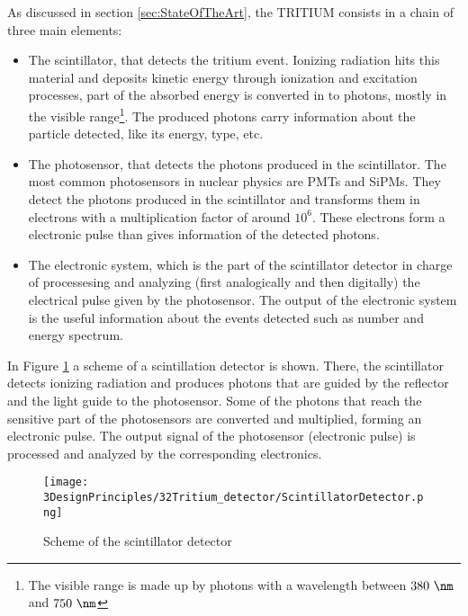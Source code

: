 As discussed in section \ref{sec:StateOfTheArt}, the TRITIUM consists in a chain of three main elements:

\begin{itemize}

\item{} The scintillator, that detects the tritium event. Ionizing radiation hits this material and deposits kinetic energy through ionization and excitation processes, part of the absorbed energy is converted in to photons, mostly in the visible range\footnote{The visible range is made up by photons with a wavelength between $380~\nm$ and $750~\nm$}. The produced photons carry information about the particle detected, like its energy, type, etc.

\item{} The photosensor, that detects the photons produced in the scintillator. The most common photosensors in nuclear physics are PMTs and SiPMs. They detect the photons produced in the scintillator and transforms them in electrons with a multiplication factor of around $10^6$. These electrons form a electronic pulse than gives information of the detected photons.

\item{} The electronic system, which is the part of the scintillator detector in charge of processesing and analyzing (first analogically and then digitally) the electrical pulse given by the photosensor. The output of the electronic system is the useful information about the events detected such as number and energy spectrum.

\end{itemize}

In Figure \ref{fig:ScintillatorDetector} a scheme of a scintillation detector is shown. There, the scintillator detects ionizing radiation and produces photons that are guided by the reflector and the light guide to the photosensor. Some of the photons that reach the sensitive part of the photosensors are converted and multiplied, forming an electronic pulse. The output signal of the photosensor (electronic pulse) is processed and analyzed by the corresponding electronics.

\begin{figure}[hbtp]
\texttt{[image: 3DesignPrinciples/32Tritium\_detector/ScintillatorDetector.png]}
\centering
\caption{Scheme of the scintillator detector\label{fig:ScintillatorDetector}}
\end{figure}
